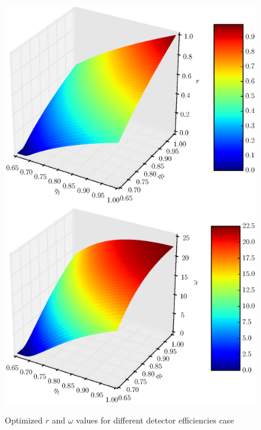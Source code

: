 \documentclass[11pt]{article}
\begin{document}
\begin{figure}[h]
\includegraphics[scale=0.7]{r3d.eps}
\includegraphics[scale=0.7]{omega3d.eps}
\caption{Optimized $r$ and $\omega$ values for different detector efficiencies case}
\label{fig:psi_opt_3d}
\end{figure}
\end{document}
